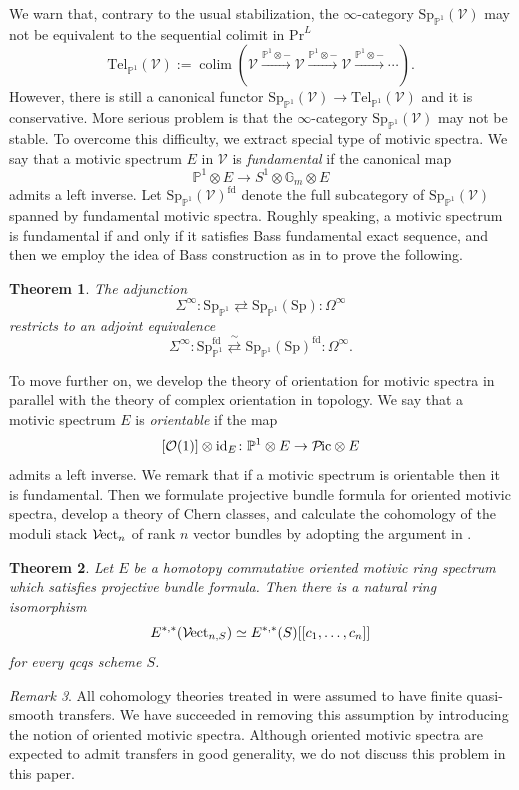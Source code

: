 \documentclass{amsart}
\theoremstyle{plain}
\newtheorem{theorem}{Theorem}[subsection]
\theoremstyle{definition}
\theoremstyle{remark}
\newtheorem{remark}[theorem]{Remark}
\numberwithin{equation}{theorem}
\newcommand{\mcal}[1]{\mathcal{#1}}
\newcommand{\mbb}[1]{\mathbb{#1}}
\renewcommand{\Pr}{\mathrm{Pr}}
\newcommand{\Sp}{\mathrm{Sp}}
\newcommand{\V}{\mathcal{V}}
\newcommand{\fd}{\mathrm{fd}}
\newcommand{\id}{\mathrm{id}}
\newcommand{\SpP}{\mathrm{Sp}_{\mathbb{P}^1}}
\newcommand{\TelP}{\mathrm{Tel}_{\mathbb{P}^1}}
\newcommand{\Pic}{{\mathcal{P}\mspace{-2.0mu}\mathrm{ic}}}
\newcommand{\Vect}{{\mathcal{V}\mspace{-2.0mu}\mathrm{ect}}}
\newcommand{\colim}{\operatorname*{colim}}
\begin{document}
We warn that, contrary to the usual stabilization, the $\infty$-category $\SpP(\V)$ may not be equivalent to the sequential colimit in $\Pr^L$
\[
	\TelP(\V) := \colim(\V\xrightarrow{\mbb{P}^1\otimes-}\V\xrightarrow{\mbb{P}^1\otimes-}\V\xrightarrow{\mbb{P}^1\otimes-}\cdots).
\]
However, there is still a canonical functor $\SpP(\V)\to\TelP(\V)$ and it is conservative.
More serious problem is that the $\infty$-category $\SpP(\V)$ may not be stable.
To overcome this difficulty, we extract special type of motivic spectra.
We say that a motivic spectrum $E$ in $\V$ is \textit{fundamental} if the canonical map
\[
	\mbb{P}^1\otimes E \to S^1\otimes\mbb{G}_m\otimes E
\]
admits a left inverse.
Let $\SpP(\V)^\fd$ denote the full subcategory of $\SpP(\V)$ spanned by fundamental motivic spectra.
Roughly speaking, a motivic spectrum is fundamental if and only if it satisfies Bass fundamental exact sequence, and then we employ the idea of Bass construction as in \cite{TT} to prove the following.

\begin{theorem}\label{thm2}
The adjunction
\[
	\Sigma^\infty \colon \SpP \rightleftarrows \SpP(\Sp) \colon \Omega^\infty
\]
restricts to an adjoint equivalence
\[
	\Sigma^\infty \colon \SpP^\fd \overset{\sim}{\rightleftarrows} \SpP(\Sp)^\fd \colon \Omega^\infty.
\]
\end{theorem}

To move further on, we develop the theory of orientation for motivic spectra in parallel with the theory of complex orientation in topology.
We say that a motivic spectrum $E$ is \textit{orientable} if the map
\[
	[\mcal{O}(1)]\otimes\id_E \colon \mbb{P}^1\otimes E \to \Pic\otimes E
\]
admits a left inverse.
We remark that if a motivic spectrum is orientable then it is fundamental.
Then we formulate projective bundle formula for oriented motivic spectra, develop a theory of Chern classes, and calculate the cohomology of the moduli stack $\Vect_n$ of rank $n$ vector bundles by adopting the argument in \cite{AI}.

\begin{theorem}\label{thm3}
Let $E$ be a homotopy commutative oriented motivic ring spectrum which satisfies projective bundle formula.
Then there is a natural ring isomorphism
\[
	E^{*,*}(\Vect_{n,S}) \simeq E^{*,*}(S)[[c_1,\dotsc,c_n]]
\]
for every qcqs scheme $S$.
\end{theorem}

\begin{remark}
All cohomology theories treated in \cite{AI} were assumed to have finite quasi-smooth transfers.
We have succeeded in removing this assumption by introducing the notion of oriented motivic spectra.
Although oriented motivic spectra are expected to admit transfers in good generality, we do not discuss this problem in this paper.
\end{remark}
\end{document}
